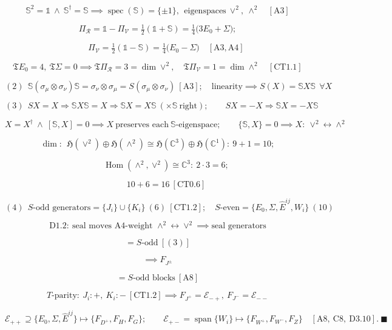 \begin{theorem}
\[
\mathbb S^2=\mathbb1\ \wedge\ \mathbb S^\dagger=\mathbb S\implies\operatorname{spec}(\mathbb S)=\{\pm1\},\ \ \text{eigenspaces}\ \vee^2,\ \wedge^2\quad[\mathrm{A3}]
\]

\[
\Pi_{\mathcal R}=\mathbb1-\Pi_{\mathcal V}=\tfrac12(\mathbb1+\mathbb S)=\tfrac14\bigl(3E_0+\Sigma\bigr);
\]

\[
\qquad \Pi_{\mathcal V}=\tfrac12(\mathbb1-\mathbb S)=\tfrac14\bigl(E_0-\Sigma\bigr)\quad[\mathrm{A3},\mathrm{A4}]
\]

\[
\mathfrak T E_0=4,\ \mathfrak T\Sigma=0\implies\mathfrak T\Pi_{\mathcal R}=3=\dim\vee^2,\quad\mathfrak T\Pi_{\mathcal V}=1=\dim\wedge^2\quad[\mathrm{CT1.1}]
\]

\[
(2)\ \ \mathbb S(\sigma_\mu\otimes\sigma_\nu)\mathbb S=\sigma_\nu\otimes\sigma_\mu=S(\sigma_\mu\otimes\sigma_\nu)\ [\mathrm{A3}];\quad\text{linearity}\implies S(X)=\mathbb S X\mathbb S\ \ \forall X
\]

\[
(3)\ \ SX=X\Rightarrow\mathbb S X\mathbb S=X\Rightarrow\mathbb S X=X\mathbb S\ (\times\mathbb S\ \text{right});\qquad SX=-X\Rightarrow\mathbb S X=-X\mathbb S
\]

\[
X=X^\dagger\ \wedge\ [\mathbb S,X]=0\implies X\ \text{preserves each}\ \mathbb S\text{-eigenspace};\qquad
\{\mathbb S,X\}=0\implies X:\ \vee^2\leftrightarrow\wedge^2
\]

\[
\dim:\ \ \mathfrak H(\vee^2)\oplus\mathfrak H(\wedge^2)\cong\mathfrak H(\mathbb C^3)\oplus\mathfrak H(\mathbb C^1):\ 9+1=10;
\]

\[
\qquad \operatorname{Hom}(\wedge^2,\vee^2)\cong\mathbb C^{3}:\ 2\cdot3=6;
\]

\[
\qquad 10+6=16\ [\mathrm{CT0.6}]
\]

\[
(4)\ \ S\text{-odd generators}=\{J_i\}\cup\{K_i\}\ (6)\ [\mathrm{CT1.2}];\quad S\text{-even}=\{E_0,\Sigma,\hat E^{ij},W_i\}\ (10)
\]

\[
\mathrm{D1.2}:\ \text{seal moves A4-weight }\wedge^2\!\leftrightarrow\!\vee^2\implies\text{seal generators}
\]

\[
= S\text{-odd}\ [(3)]
\]

\[
\implies F_{J^\pm}
\]

\[
= S\text{-odd blocks}\ [\mathrm{A8}]
\]

\[
T\text{-parity}:\ J_i:+,\ K_i:-\ [\mathrm{CT1.2}]\implies F_{J^+}=\mathcal E_{-+},\ F_{J^-}=\mathcal E_{--}
\]

\[
\mathcal E_{++}\supseteq\{E_0,\Sigma,\hat E^{ij}\}\mapsto\{F_{D^+},F_H,F_G\};\qquad
\mathcal E_{+-}=\operatorname{span}\{W_i\}\mapsto\{F_{W^+},F_{W^-},F_Z\}\quad[\mathrm{A8},\ \mathrm{C8},\ \mathrm{D3.10}].\ \blacksquare
\]

\end{theorem}

